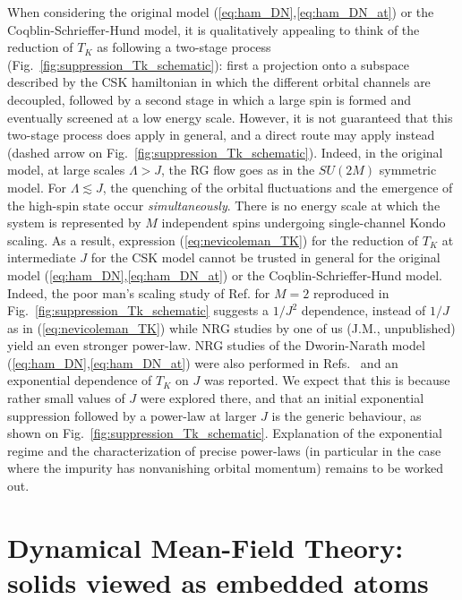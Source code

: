 \documentclass[]{ar2e-changed}%
\begin{document}
When considering the original model  (\ref{eq:ham_DN},\ref{eq:ham_DN_at}) or the Coqblin-Schrieffer-Hund model, it is qualitatively appealing to 
think of the reduction of $T_K$ as following a two-stage process (Fig.~\ref{fig:suppression_Tk_schematic}): 
first a projection onto a subspace described by the %
CSK hamiltonian in which the different orbital channels are decoupled, 
followed by a second stage in which a large spin is formed and eventually screened at a low energy scale. 
%
However, it is not guaranteed that this two-stage process does apply in general, and a direct route may apply instead 
(dashed arrow on Fig.~\ref{fig:suppression_Tk_schematic}).  
% 
Indeed, in the original model, at large scales $\Lambda>J$, the RG flow
goes as in the $SU(2M)$ symmetric model.  For $\Lambda\lesssim J$, the quenching of the orbital
fluctuations and the emergence of the high-spin state occur \emph{simultaneously}. 
%
There is no energy scale at which the system is represented
by $M$ independent spins undergoing single-channel Kondo scaling.
%
As a result, expression (\ref{eq:nevicoleman_TK}) for the reduction of $T_K$ at intermediate $J$ 
for the CSK %
model cannot be trusted in general for the original model (\ref{eq:ham_DN},\ref{eq:ham_DN_at}) or the Coqblin-Schrieffer-Hund model. 
%
Indeed, the poor man's scaling study of Ref.\cite{yanase97} for $M=2$ reproduced 
in Fig.~\ref{fig:suppression_Tk_schematic} suggests a $1/J^2$ dependence, instead of $1/J$  as in (\ref{eq:nevicoleman_TK})  
while NRG studies by one of us (J.M., unpublished) yield an even stronger power-law. 
%
NRG studies of the Dworin-Narath model (\ref{eq:ham_DN},\ref{eq:ham_DN_at}) were also performed in
Refs.~\cite{nishikawa_hewson_prb_2010_1,nishikawa_hewson_prb_2010_2}
and an exponential dependence of $T_K$ on $J$ was reported. We expect
that this is because rather small values of $J$ were explored there,
and that an initial exponential suppression followed by a power-law at
larger $J$ is the generic behaviour, as shown on
Fig.~\ref{fig:suppression_Tk_schematic}. Explanation of the
exponential regime and the characterization of precise power-laws (in
particular in the case where the impurity has nonvanishing orbital
momentum) remains to be worked out. 


\section{Dynamical Mean-Field Theory: solids viewed as embedded atoms}
\label{sec:dmft}
\end{document}
